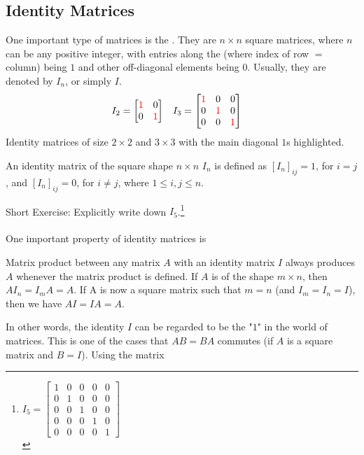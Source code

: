 \subsection{Identity Matrices}
One important type of matrices is the . They are $n \times n$ square matrices, where $n$ can be any positive integer, with entries along the  (where index of row $=$ column) being $1$ and other off-diagonal elements being $0$. Usually, they are denoted by $I_n$, or simply $I$.
\begin{align*}
I_2 &= 
\begin{bmatrix}
\textcolor{red}{1} & 0 \\
0 & \textcolor{red}{1}
\end{bmatrix}
& I_3 &= 
\begin{bmatrix}
\textcolor{red}{1} & 0 & 0 \\
0 & \textcolor{red}{1} & 0 \\
0 & 0 & \textcolor{red}{1}
\end{bmatrix}
\end{align*}
Identity matrices of size $2 \times 2$ and $3 \times 3$ with the main diagonal $1$s highlighted.
\begin{defn}
An identity matrix of the square shape $n \times n$ $I_n$ is defined as $[I_{n}]_{ij} = 1$, for $i = j$, and $[I_{n}]_{ij} = 0$, for $i \neq j$, where $1 \leq i,j \leq n$.
\end{defn}
Short Exercise: Explicitly write down $I_5$.\footnote{$I_5=
\begin{bmatrix}
1 & 0 & 0 & 0 & 0 \\
0 & 1 & 0 & 0 & 0 \\
0 & 0 & 1 & 0 & 0 \\
0 & 0 & 0 & 1 & 0 \\
0 & 0 & 0 & 0 & 1
\end{bmatrix}$\\}\\
\\
One important property of identity matrices is
\begin{proper}
\label{proper:identity}
Matrix product between any matrix $A$ with an identity matrix $I$ always produces $A$ whenever the matrix product is defined. If $A$ is of the shape $m \times n$, then $AI_n = I_mA = A$. If A is now a square matrix such that $m=n$ (and $I_m = I_n = I$), then we have $AI = IA = A$.
\end{proper}
In other words, the identity $I$ can be regarded to be the "$1$" in the world of matrices. This is one of the cases that $AB = BA$ commutes (if $A$ is a square matrix and $B=I$). Using the matrix
